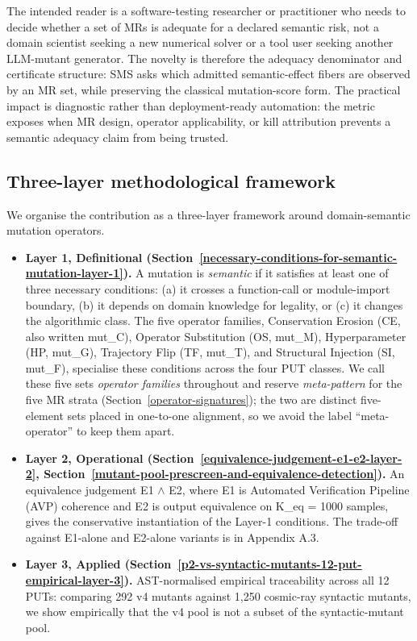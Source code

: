 \documentclass[manuscript,screen,review]{acmart}
\begin{document}
The intended reader is a software-testing researcher or practitioner who
needs to decide whether a set of MRs is adequate for a declared semantic
risk, not a domain scientist seeking a new numerical solver or a tool
user seeking another LLM-mutant generator. The novelty is therefore the
adequacy denominator and certificate structure: SMS asks which admitted
semantic-effect fibers are observed by an MR set, while preserving the
classical mutation-score form. The practical impact is diagnostic rather
than deployment-ready automation: the metric exposes when MR design,
operator applicability, or kill attribution prevents a semantic adequacy
claim from being trusted.

\subsection{Three-layer methodological framework}\label{three-layer-methodological-framework}

We organise the contribution as a three-layer framework around
domain-semantic mutation operators.

\begin{itemize}

\item
  \textbf{Layer 1, Definitional (Section~\ref{necessary-conditions-for-semantic-mutation-layer-1}).} A mutation is \emph{semantic}
  if it satisfies at least one of three necessary conditions: (a) it
  crosses a function-call or module-import boundary, (b) it depends on
  domain knowledge for legality, or (c) it changes the algorithmic
  class. The five operator families, Conservation Erosion (CE, also
  written mut\_C), Operator Substitution (OS, mut\_M), Hyperparameter
  (HP, mut\_G), Trajectory Flip (TF, mut\_T), and Structural Injection
  (SI, mut\_F), specialise these conditions across the four PUT classes.
  We call these five sets \emph{operator families} throughout and reserve
  \emph{meta-pattern} for the five MR strata (Section~\ref{operator-signatures});
  the two are distinct five-element sets placed in one-to-one alignment,
  so we avoid the label ``meta-operator'' to keep them apart.
\item
  \textbf{Layer 2, Operational (Section~\ref{equivalence-judgement-e1-e2-layer-2}, Section~\ref{mutant-pool-prescreen-and-equivalence-detection}).} An equivalence judgement
  E1 $\wedge$ E2, where E1 is Automated Verification Pipeline (AVP) coherence
  and E2 is output equivalence on K\_eq = 1000 samples, gives the
  conservative instantiation of the Layer-1 conditions. The trade-off
  against E1-alone and E2-alone variants is in Appendix A.3.
\item
  \textbf{Layer 3, Applied (Section~\ref{p2-vs-syntactic-mutants-12-put-empirical-layer-3}).} AST-normalised empirical
  traceability across all 12 PUTs: comparing 292 v4 mutants against
  1,250 cosmic-ray syntactic mutants, we show empirically that the v4
  pool is not a subset of the syntactic-mutant pool.
\end{itemize}
\end{document}
